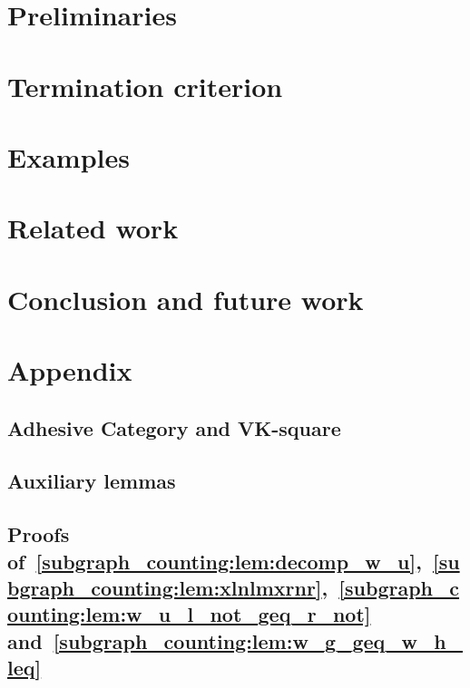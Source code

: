 \documentclass{report}
\begin{document}
\section{Preliminaries} 
\label{subgraph_counting:sec:pre} 


 
  
\section{Termination criterion}
\label{subgraph_counting:sec:termination} 

 

\section{Examples} 
\label{subgraph_counting:sec:examples}


  
\section{Related work}
\label{subgraph_counting:sec:related_work} 


\section{Conclusion and future work}
\label{subgraph_counting:sec:conclusion} 


\section{Appendix}
\subsection*{Adhesive Category and VK-square}

\subsection*{Auxiliary lemmas}

\subsection*{Proofs of~\autoref{subgraph_counting:lem:decomp_w_u},~\autoref{subgraph_counting:lem:xlnlmxrnr},~\autoref{subgraph_counting:lem:w_u_l_not_geq_r_not} and~\autoref{subgraph_counting:lem:w_g_geq_w_h_leq}}
\label{subgraph_counting:sec:appendix:a}

\end{document}
